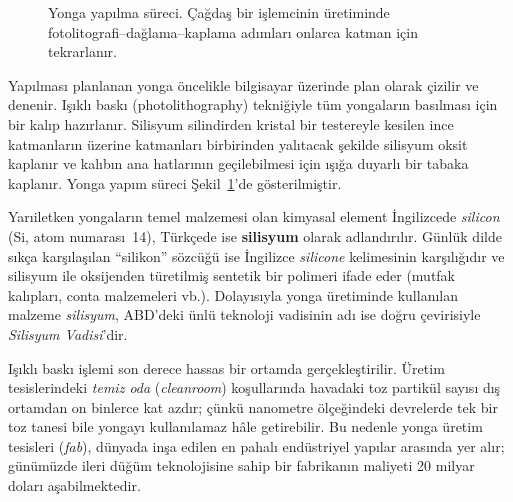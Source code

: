 \begin{figure}[H]
\caption[Yonga yapılma süreci]{Yonga yapılma süreci. Çağdaş bir işlemcinin üretiminde fotolitografi--dağlama--kaplama adımları onlarca katman için tekrarlanır.}
\label{fig:yonga-yapim}
\end{figure}

Yapılması planlanan yonga öncelikle bilgisayar üzerinde plan olarak çizilir ve denenir. Işıklı baskı (photolithography) tekniğiyle tüm yongaların basılması için bir kalıp hazırlanır. Silisyum silindirden kristal bir testereyle kesilen ince katmanların üzerine katmanları birbirinden yalıtacak şekilde silisyum oksit kaplanır ve kalıbın ana hatlarının geçilebilmesi için ışığa duyarlı bir tabaka kaplanır. Yonga yapım süreci Şekil~\ref{fig:yonga-yapim}'de gösterilmiştir.

\begin{bilginot}
Yarıiletken yongaların temel malzemesi olan kimyasal element İngilizcede \emph{silicon} (Si, atom numarası~14), Türkçede ise \textbf{silisyum} olarak adlandırılır. Günlük dilde sıkça karşılaşılan ``silikon'' sözcüğü ise İngilizce \emph{silicone} kelimesinin karşılığıdır ve silisyum ile oksijenden türetilmiş sentetik bir polimeri ifade eder (mutfak kalıpları, conta malzemeleri vb.). Dolayısıyla yonga üretiminde kullanılan malzeme \emph{silisyum}, ABD'deki ünlü teknoloji vadisinin adı ise doğru çevirisiyle \emph{Silisyum Vadisi}'dir.
\end{bilginot}

Işıklı baskı işlemi son derece hassas bir ortamda gerçekleştirilir. Üretim tesislerindeki \emph{temiz oda} (\emph{cleanroom}) koşullarında havadaki toz partikül sayısı dış ortamdan on binlerce kat azdır; çünkü nanometre ölçeğindeki devrelerde tek bir toz tanesi bile yongayı kullanılamaz hâle getirebilir. Bu nedenle yonga üretim tesisleri (\emph{fab}), dünyada inşa edilen en pahalı endüstriyel yapılar arasında yer alır; günümüzde ileri düğüm teknolojisine sahip bir fabrikanın maliyeti 20 milyar doları aşabilmektedir.

